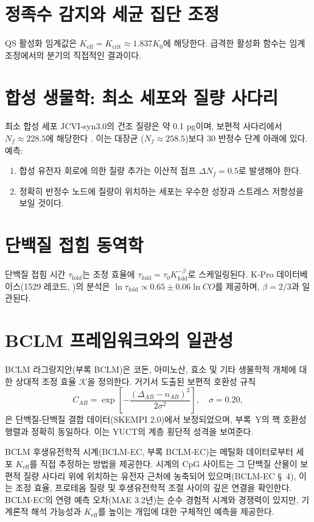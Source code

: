 \documentclass[11pt,a4paper]{article}
\newcommand{\REL}{\mathcal{K}}
\begin{document}
	\section{정족수 감지와 세균 집단 조정}
	
	QS 활성화 임계값은 \(K_{\text{eff}} = K_{\mathrm{crit}} \approx 1.837 K_0\)에 해당한다. 급격한 활성화 함수는 임계 조정에서의 분기의 직접적인 결과이다.
	
	\section{합성 생물학: 최소 세포와 질량 사다리}
	
	최소 합성 세포 JCVI‑syn3.0의 건조 질량은 약 0.1 pg이며, 보편적 사다리에서 \(N_f \approx 228.5\)에 해당한다 \cite{Hutchison2016, Pelletier2023}. 이는 대장균 (\(N_f \approx 258.5\))보다 30 반정수 단계 아래에 있다. 예측:
	\begin{enumerate}
		\item 합성 유전자 회로에 의한 질량 추가는 이산적 점프 \(\Delta N_f = 0.5\)로 발생해야 한다.
		\item 정확히 반정수 노드에 질량이 위치하는 세포는 우수한 성장과 스트레스 저항성을 보일 것이다.
	\end{enumerate}
	
	\section{단백질 접힘 동역학}
	
	단백질 접힘 시간 \(\tau_{\text{fold}}\)는 조정 효율에 \(\tau_{\text{fold}} = \tau_0 K_{\text{fold}}^{-\beta}\)로 스케일링된다. K‑Pro 데이터베이스(1529 레코드, \cite{Turina2023})의 분석은 \(\ln \tau_{\text{fold}} \propto 0.65 \pm 0.06 \ln CO\)를 제공하며, \(\beta=2/3\)과 일관된다.
	
	\section{BCLM 프레임워크와의 일관성}
	
	BCLM 라그랑지안(부록 BCLM)은 코돈, 아미노산, 효소 및 기타 생물학적 개체에 대한 상대적 조정 효율 \(\REL\)을 정의한다. 거기서 도출된 보편적 호환성 규칙
	\[
	C_{AB} = \exp\!\left[-\frac{(\Delta_{AB}-n_{AB})^2}{2\sigma^2}\right],\quad \sigma=0.20,
	\]
	은 단백질-단백질 결합 데이터(SKEMPI 2.0)에서 보정되었으며, 부록~Y의 핵 호환성 행렬과 정확히 동일하다. 이는 YUCT의 계층 횡단적 성격을 보여준다.
	
	BCLM 후생유전학적 시계(BCLM-EC, 부록 BCLM-EC)는 메틸화 데이터로부터 세포 \(K_{\mathrm{eff}}\)를 직접 추정하는 방법을 제공한다. 시계의 CpG 사이트는 그 단백질 산물이 보편적 질량 사다리 위에 위치하는 유전자 근처에 농축되어 있으며(BCLM-EC §~4), 이는 조정 효율, 프로테옴 질량 및 후생유전학적 조절 사이의 깊은 연결을 확인한다. BCLM-EC의 연령 예측 오차(MAE 3.2년)는 순수 경험적 시계와 경쟁력이 있지만, 기계론적 해석 가능성과 \(K_{\mathrm{eff}}\)를 높이는 개입에 대한 구체적인 예측을 제공한다.
	
\end{document}

